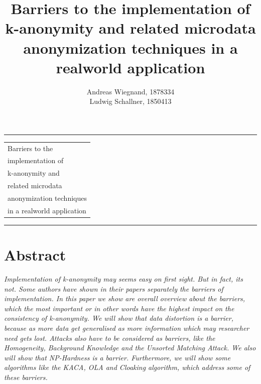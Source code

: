 \documentclass{llncs}
\begin{document}
\thispagestyle{empty}
\rule{\textwidth}{1pt}
\vspace{2pt}
\begin{flushright}
\Huge
\begin{tabular}{@{}l}
Barriers to the\\
implementation of\\
k-anonymity and\\
related microdata\\
anonymization techniques\\
in a realworld application\\[6pt]

\end{tabular}
\end{flushright}
\rule{\textwidth}{1pt}
\vfill
\title{Barriers to the implementation of k-anonymity and related microdata anonymization techniques in a realworld application}
\author{Andreas Wiegnand, 1878334\\
	Ludwig Schallner, 1850413}
\institute{}
\maketitle
%
\section*{Abstract}
\textit{Implementation of k-anonymity may seems easy on first sight. But in fact, its not. Some authors have shown in their papers separately the barriers of implementation. In this paper we show are overall overview about the barriers, which the most important or in other words have the highest impact on the consistency of k-anonymity. We will show that data distortion is a barrier, because as more data get generalised as more information which may researcher need gets lost. Attacks also have to be considered as barriers, like the Homogeneity, Background Knowledge and the Unsorted Matching Attack. We also will show that NP-Hardness is a barrier. Furthermore, we will show some algorithms like the KACA, OLA and  Cloaking algorithm, which address some of these barriers.}
\newpage
\setcounter{page}{1}
\end{document}

